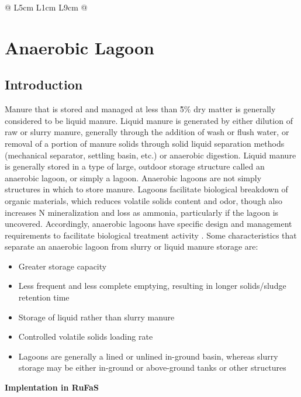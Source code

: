 \begin{refsection}
\begin{longtable}{@{} L{5cm} L{1cm} L{9cm} @{}}
\end{longtable}



    
\newpage
\section{Anaerobic Lagoon} 
 
\subsection{Introduction} Manure that is stored and managed at less than \~5\% dry matter is generally considered to be liquid manure. Liquid manure is generated by either dilution of raw or slurry manure, generally through the addition of wash or flush water, or removal of a portion of manure solids through solid liquid separation methods (mechanical separator, settling basin, etc.) or anaerobic digestion. Liquid manure is generally stored in a type of large, outdoor storage structure called an anaerobic lagoon, or simply a lagoon. Anaerobic lagoons are not simply structures in which to store manure. Lagoons facilitate biological breakdown of organic materials, which reduces volatile solids content and odor, though also increases N mineralization and loss as ammonia, particularly if the lagoon is uncovered. Accordingly, anaerobic lagoons have specific design and management requirements to facilitate biological treatment activity \parencite{NRCS2017}. Some characteristics that separate an anaerobic lagoon from slurry or liquid manure storage are:

    \begin{itemize}
        \item Greater storage capacity
        \item Less frequent and less complete emptying, resulting in longer solids/sludge retention time
        \item Storage of liquid rather than slurry manure
        \item Controlled volatile solids loading rate
        \item Lagoons are generally a lined or unlined in-ground basin, whereas slurry storage may be either in-ground or above-ground tanks or other structures

    \end{itemize}
    \vspace{0.2cm}
    
    \textbf{Implentation in RuFaS}
    \vspace{0.2cm}
    

\end{refsection}
